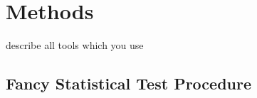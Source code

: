
\chapter{Methods}
\label{ch:methods}

describe all tools which you use


\section{Fancy Statistical Test Procedure}


